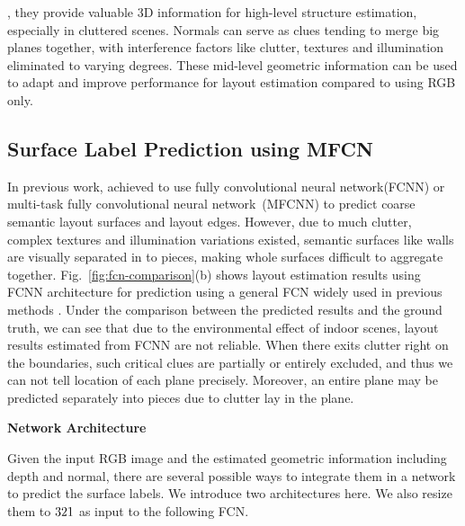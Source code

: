 , they provide valuable 3D information for high-level structure estimation, especially in cluttered scenes.
%
Normals can serve as clues tending to merge big planes together, with interference factors like clutter, textures and illumination eliminated to varying degrees. 
%
These mid-level geometric information can be used to adapt and improve performance for layout estimation compared to using RGB only. 



\subsection{Surface Label Prediction using MFCN}
\label{sec:surfacelabel}
%
In previous work, \cite{dasgupta2016delay,ren2016coarse} achieved to use fully convolutional neural network(FCNN) or multi-task fully convolutional neural network~(MFCNN) to predict coarse semantic layout surfaces and layout edges. 
%
However, due to much clutter, complex textures and illumination variations existed, semantic surfaces like walls are visually separated in to pieces, making whole surfaces difficult to aggregate together. 
%
Fig.~\ref{fig:fcn-comparison}(b) shows layout estimation results using FCNN architecture for prediction using a general FCN widely used in previous methods \cite{dasgupta2016delay,ren2016coarse}. 
Under the comparison between the predicted results and the ground truth, we can see that due to the environmental effect of indoor scenes, layout results estimated from FCNN are not reliable. 
When there exits clutter right on the boundaries, such critical clues are partially or entirely excluded, and thus we can not tell location of each plane precisely. 
Moreover, an entire plane may be predicted separately into pieces due to clutter lay in the plane.

\textbf{Network Architecture}

Given the input RGB image and the estimated geometric information including depth and normal, there are several possible ways to integrate them in a network to predict the surface labels. We introduce two architectures here.
We also resize them to $321 \time 321$ as input to the following FCN. 

